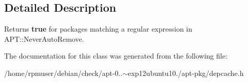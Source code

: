 \subsection{\-Detailed \-Description}
\-Returns {\bfseries true} for packages matching a regular expression in \-A\-P\-T\-::\-Never\-Auto\-Remove. 

\-The documentation for this class was generated from the following file\-:\begin{DoxyCompactItemize}
\item 
/home/rpmuser/debian/check/apt-\/0..$\sim$exp12ubuntu10./apt-\/pkg/depcache.\-h\end{DoxyCompactItemize}
